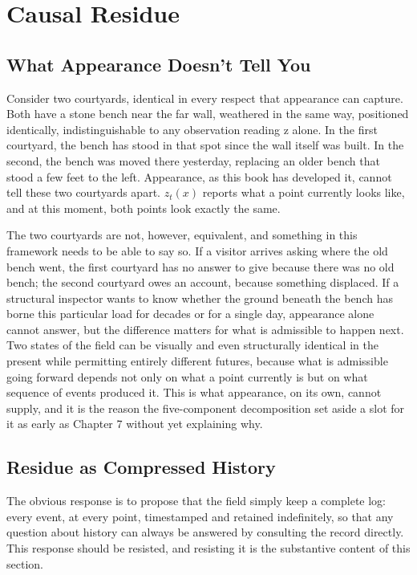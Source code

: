 \chapter{Causal Residue}

\section{What Appearance Doesn't Tell You}

Consider two courtyards, identical in every respect that appearance can capture. Both have a stone bench near the far wall, weathered in the same way, positioned identically, indistinguishable to any observation reading z alone. In the first courtyard, the bench has stood in that spot since the wall itself was built. In the second, the bench was moved there yesterday, replacing an older bench that stood a few feet to the left. Appearance, as this book has developed it, cannot tell these two courtyards apart. \(z_t(x)\) reports what a point currently looks like, and at this moment, both points look exactly the same.

The two courtyards are not, however, equivalent, and something in this framework needs to be able to say so. If a visitor arrives asking where the old bench went, the first courtyard has no answer to give because there was no old bench; the second courtyard owes an account, because something displaced. If a structural inspector wants to know whether the ground beneath the bench has borne this particular load for decades or for a single day, appearance alone cannot answer, but the difference matters for what is admissible to happen next. Two states of the field can be visually and even structurally identical in the present while permitting entirely different futures, because what is admissible going forward depends not only on what a point currently is but on what sequence of events produced it. This is what appearance, on its own, cannot supply, and it is the reason the five-component decomposition set aside a slot for it as early as Chapter 7 without yet explaining why.

\section{Residue as Compressed History}

The obvious response is to propose that the field simply keep a complete log: every event, at every point, timestamped and retained indefinitely, so that any question about history can always be answered by consulting the record directly. This response should be resisted, and resisting it is the substantive content of this section.

